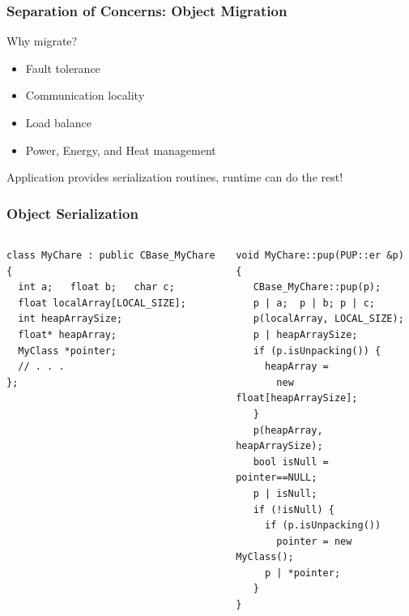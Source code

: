 \begin{frame}
\frametitle{Separation of Concerns: Object Migration}
\begin{block}{Why migrate?}
\begin{itemize}
\item Fault tolerance
\item Communication locality
\item Load balance
\item Power, Energy, and Heat management
\end{itemize}
\end{block}
\pause
Application provides serialization routines, runtime can do the rest!
\end{frame}

\begin{frame}[fragile]
\frametitle{Object Serialization}
\begin{columns}
\begin{column}{0.5\textwidth}
\begin{lstlisting}
class MyChare : public CBase_MyChare {
  int a;   float b;   char c;
  float localArray[LOCAL_SIZE];
  int heapArraySize;
  float* heapArray;
  MyClass *pointer;
  // . . . 
};
\end{lstlisting}
\end{column}
\begin{column}{0.5\textwidth}
\begin{lstlisting}
void MyChare::pup(PUP::er &p) {
   CBase_MyChare::pup(p);
   p | a;  p | b; p | c;
   p(localArray, LOCAL_SIZE);
   p | heapArraySize;
   if (p.isUnpacking()) {
     heapArray =
       new float[heapArraySize];
   }
   p(heapArray, heapArraySize);
   bool isNull = pointer==NULL;
   p | isNull;
   if (!isNull) {
     if (p.isUnpacking())
       pointer = new MyClass();
     p | *pointer;
   }
}
\end{lstlisting}
\end{column}
\end{columns}
\end{frame}
